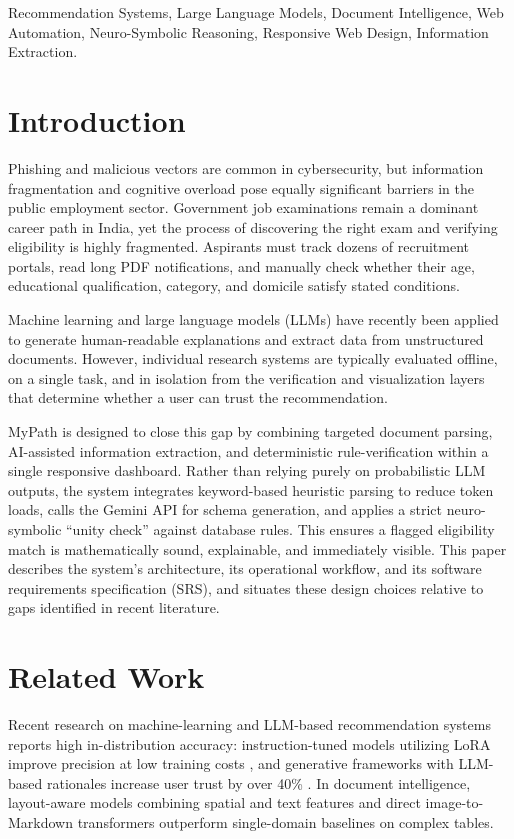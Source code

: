 \documentclass[conference]{IEEEtran}
\begin{document}
\begin{IEEEkeywords}
Recommendation Systems, Large Language Models, Document Intelligence, Web Automation, Neuro-Symbolic Reasoning, Responsive Web Design, Information Extraction.
\end{IEEEkeywords}

\section{Introduction}

Phishing and malicious vectors are common in cybersecurity, but information fragmentation and cognitive overload pose equally significant barriers in the public employment sector. Government job examinations remain a dominant career path in India, yet the process of discovering the right exam and verifying eligibility is highly fragmented. Aspirants must track dozens of recruitment portals, read long PDF notifications, and manually check whether their age, educational qualification, category, and domicile satisfy stated conditions.

Machine learning and large language models (LLMs) have recently been applied to generate human-readable explanations and extract data from unstructured documents. However, individual research systems are typically evaluated offline, on a single task, and in isolation from the verification and visualization layers that determine whether a user can trust the recommendation. 

MyPath is designed to close this gap by combining targeted document parsing, AI-assisted information extraction, and deterministic rule-verification within a single responsive dashboard. Rather than relying purely on probabilistic LLM outputs, the system integrates keyword-based heuristic parsing to reduce token loads, calls the Gemini API for schema generation, and applies a strict neuro-symbolic ``unity check'' against database rules. This ensures a flagged eligibility match is mathematically sound, explainable, and immediately visible. This paper describes the system's architecture, its operational workflow, and its software requirements specification (SRS), and situates these design choices relative to gaps identified in recent literature.

\section{Related Work}

Recent research on machine-learning and LLM-based recommendation systems reports high in-distribution accuracy: instruction-tuned models utilizing LoRA improve precision at low training costs \cite{b6}, and generative frameworks with LLM-based rationales increase user trust by over 40\% \cite{b7}. In document intelligence, layout-aware models combining spatial and text features \cite{b3} and direct image-to-Markdown transformers \cite{b4} outperform single-domain baselines on complex tables. 
\end{document}

